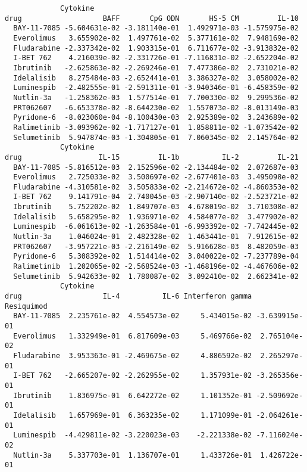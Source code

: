 \documentclass[11pt, a4paper, twosided]{book}
\begin{document}
\begin{verbatim}
             Cytokine
drug                   BAFF       CpG ODN       HS-5 CM         IL-10
  BAY-11-7085 -5.604631e-02 -3.181140e-01  1.492971e-03 -1.575975e-02
  Everolimus   3.655902e-02  1.497761e-02  5.377161e-02  7.948169e-02
  Fludarabine -2.337342e-02  1.903315e-01  6.711677e-02 -3.913832e-02
  I-BET 762    4.216039e-02 -2.331726e-01 -7.116831e-02 -2.652204e-02
  Ibrutinib   -2.625863e-02 -2.269246e-01  7.477386e-02  2.731021e-02
  Idelalisib   8.275484e-03 -2.652441e-01  3.386327e-02  3.058002e-02
  Luminespib  -2.482555e-01 -2.591311e-01 -3.940346e-01 -6.458359e-02
  Nutlin-3a   -1.258362e-03  1.577514e-01  7.700330e-02  9.299536e-02
  PRT062607   -6.653378e-02 -8.644230e-02  1.557073e-02 -8.013149e-03
  Pyridone-6  -8.023060e-04 -8.100430e-03  2.925389e-02  3.243689e-02
  Ralimetinib -3.093962e-02 -1.717127e-01  1.858811e-02 -1.073542e-02
  Selumetinib  5.947874e-03 -1.304805e-01  7.060345e-02  2.145764e-02
             Cytokine
drug                  IL-15         IL-1b          IL-2         IL-21
  BAY-11-7085 -5.816512e-03  2.152596e-02 -2.134484e-02  2.072687e-03
  Everolimus   2.725033e-02  3.500697e-02 -2.677401e-03  3.495098e-02
  Fludarabine -4.310581e-02  3.505833e-02 -2.214672e-02 -4.860353e-02
  I-BET 762    9.141791e-04  2.740045e-03 -2.907140e-02 -2.523721e-02
  Ibrutinib    5.752202e-02  1.849707e-03  4.678019e-02  3.710308e-02
  Idelalisib   5.658295e-02  1.936971e-02  4.584077e-02  3.477902e-02
  Luminespib  -6.061613e-02 -1.263584e-01 -6.993392e-02 -7.742445e-02
  Nutlin-3a    1.046024e-01  2.482328e-02  1.463441e-01  7.912615e-02
  PRT062607   -3.957221e-03 -2.216149e-02  5.916628e-03  8.482059e-03
  Pyridone-6   5.308392e-02  1.514414e-02  3.040022e-02 -7.237789e-04
  Ralimetinib  1.202065e-02 -2.568524e-03 -1.468196e-02 -4.467606e-02
  Selumetinib  5.942633e-02  1.780087e-02  3.092410e-02  2.662341e-02
             Cytokine
drug                   IL-4          IL-6 Interferon gamma    Resiquimod
  BAY-11-7085  2.235761e-02  4.554573e-02     5.434015e-02 -3.639915e-01
  Everolimus   1.332949e-01  6.817609e-03     5.469766e-02  2.765104e-02
  Fludarabine  3.953363e-01 -2.469675e-02     4.886592e-02  2.265297e-01
  I-BET 762   -2.665207e-02 -2.262955e-02     1.357931e-02 -3.265356e-01
  Ibrutinib    1.836975e-01  6.642272e-02     1.101352e-01 -2.509692e-01
  Idelalisib   1.657969e-01  6.363235e-02     1.171099e-01 -2.064261e-01
  Luminespib  -4.429811e-02 -3.220023e-03    -2.221338e-02 -7.116024e-02
  Nutlin-3a    5.337703e-01  1.136707e-01     1.433726e-01  1.426722e-01

\end{verbatim}
\end{document}
